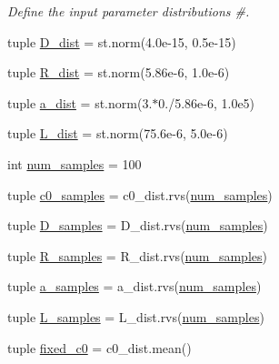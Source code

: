 \begin{DoxyCompactItemize}
\begin{DoxyCompactList}\small\item\em Define the input parameter distributions \#. \end{DoxyCompactList}\item 
tuple \hyperlink{namespace_uncertainty___propagation_a5896454d88496c6554718f56476236d0}{D\-\_\-dist} = st.\-norm(4.\-0e-\/15, 0.\-5e-\/15)
\item 
tuple \hyperlink{namespace_uncertainty___propagation_ac07f0a77ab7492fb7046054192039280}{R\-\_\-dist} = st.\-norm(5.\-86e-\/6, 1.\-0e-\/6)
\item 
tuple \hyperlink{namespace_uncertainty___propagation_aa0934f3f87aa3b2cdbc3d6d8e648d5a3}{a\-\_\-dist} = st.\-norm(3.$\ast$0./5.\-86e-\/6, 1.\-0e5)
\item 
tuple \hyperlink{namespace_uncertainty___propagation_a9dd2d48c13873f64c963b96328631c78}{L\-\_\-dist} = st.\-norm(75.\-6e-\/6, 5.\-0e-\/6)
\item 
int \hyperlink{namespace_uncertainty___propagation_a32bff09a616cee12a2c61815a990152d}{num\-\_\-samples} = 100
\item 
tuple \hyperlink{namespace_uncertainty___propagation_ae2539890c28b90e3780f315d426c1ba6}{c0\-\_\-samples} = c0\-\_\-dist.\-rvs(\hyperlink{namespace_uncertainty___propagation_a32bff09a616cee12a2c61815a990152d}{num\-\_\-samples})
\item 
tuple \hyperlink{namespace_uncertainty___propagation_a5b16e1d69bbcd5334cdddf537c3171d2}{D\-\_\-samples} = D\-\_\-dist.\-rvs(\hyperlink{namespace_uncertainty___propagation_a32bff09a616cee12a2c61815a990152d}{num\-\_\-samples})
\item 
tuple \hyperlink{namespace_uncertainty___propagation_a48a93972bddd620b71755a37ec6f337b}{R\-\_\-samples} = R\-\_\-dist.\-rvs(\hyperlink{namespace_uncertainty___propagation_a32bff09a616cee12a2c61815a990152d}{num\-\_\-samples})
\item 
tuple \hyperlink{namespace_uncertainty___propagation_aa45ac5af3cf52071fc2bf7f9895e3cc1}{a\-\_\-samples} = a\-\_\-dist.\-rvs(\hyperlink{namespace_uncertainty___propagation_a32bff09a616cee12a2c61815a990152d}{num\-\_\-samples})
\item 
tuple \hyperlink{namespace_uncertainty___propagation_a506fed32170756c08599a57d9dde1788}{L\-\_\-samples} = L\-\_\-dist.\-rvs(\hyperlink{namespace_uncertainty___propagation_a32bff09a616cee12a2c61815a990152d}{num\-\_\-samples})
\item 
tuple \hyperlink{namespace_uncertainty___propagation_a66aeb0f33c59c12b7b9eb6ea98f6dbee}{fixed\-\_\-c0} = c0\-\_\-dist.\-mean()

\end{DoxyCompactItemize}
